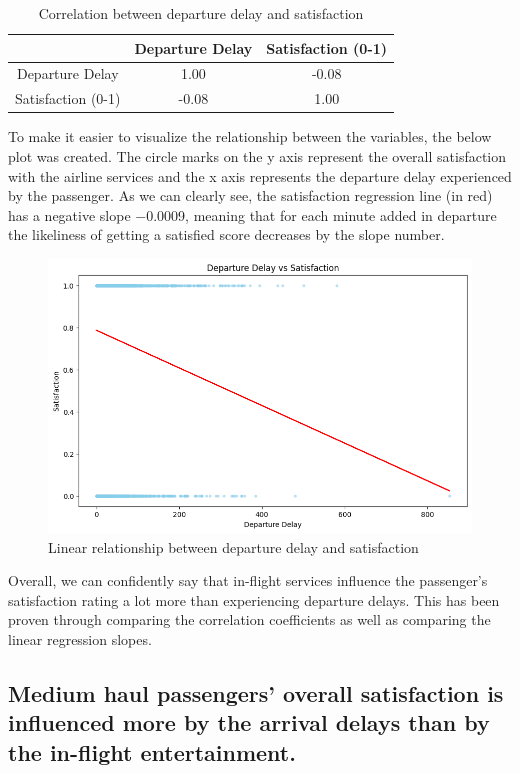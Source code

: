 \documentclass[11pt]{article}
\begin{document}
\begin{table}[!h]
    \centering
    \begin{tabular}{|c|c|c|}
        \hline
        &  Departure Delay & Satisfaction (0-1) \\
        \hline
        Departure Delay   &   1.00  &  -0.08 \\
        \hline
        Satisfaction (0-1)     &   -0.08  &  1.00 \\
        \hline
    \end{tabular}
    \caption{Correlation between departure delay and satisfaction}
    \label{tab:corr-depd-s}
\end{table}

To make it easier to visualize the relationship between the variables, the below plot was created. The circle marks on the y axis represent the overall satisfaction with the airline services and the x axis represents the departure delay experienced by the passenger. As we can clearly see, the satisfaction regression line (in red) has a negative slope \num{-0.0009}, meaning that for each minute added in departure the likeliness of getting a satisfied score decreases by the slope number.

\begin{figure}[h]
\centering
\includegraphics[width=0.5\linewidth]{project_files/project_21_2.png}
\caption{Linear relationship between departure delay and satisfaction}
\end{figure}
    
Overall, we can confidently say that in-flight services influence the passenger's satisfaction rating a lot more than experiencing departure delays. This has been proven through comparing the correlation coefficients as well as comparing the linear regression slopes. 

\subsection{Medium haul passengers’ overall satisfaction is influenced more by the arrival delays than by the in-flight entertainment.}
\end{document}
